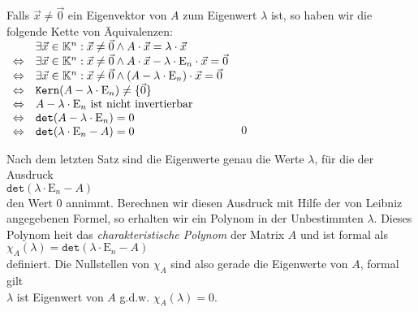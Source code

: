 \proof
Falls $\vec{x} \not= \vec{0}$ ein Eigenvektor von $A$ zum Eigenwert $\lambda$ ist, so haben wir die folgende
Kette von \"Aquivalenzen:
\\[0.2cm]
\hspace*{1.3cm}
$
\begin{array}[b]{lll}
                  & \exists \vec{x} \in \mathbb{K}^n: \vec{x} \not=\vec{0} \wedge A \cdot \vec{x}  = \lambda \cdot \vec{x} \\
\Leftrightarrow   & \exists \vec{x} \in \mathbb{K}^n: \vec{x} \not=\vec{0} \wedge A \cdot \vec{x} - \lambda \cdot \mathrm{E}_n \cdot \vec{x} = \vec{0} \\
\Leftrightarrow   & \exists \vec{x} \in \mathbb{K}^n: \vec{x} \not=\vec{0} \wedge (A - \lambda \cdot \mathrm{E}_n) \cdot \vec{x} = \vec{0} \\
\Leftrightarrow   & \mathtt{Kern}(A - \lambda \cdot \mathrm{E}_n) \not= \{\vec{0}\} \\
\Leftrightarrow   & \mbox{$A - \lambda \cdot \mathrm{E}_n$ ist nicht invertierbar} \\
\Leftrightarrow   & \mathtt{det}(A - \lambda \cdot \mathrm{E}_n) = 0  \\
\Leftrightarrow   & \mathtt{det}(\lambda \cdot \mathrm{E}_n - A) = 0  
\end{array}
$
\qed

Nach dem letzten Satz sind die Eigenwerte genau die Werte $\lambda$, f\"ur die der Ausdruck 
\\[0.2cm]
\hspace*{1.3cm}
 $\mathtt{det}(\lambda \cdot \mathrm{E}_n- A)$
\\[0.2cm]
den Wert $0$ annimmt.  Berechnen wir diesen Ausdruck mit Hilfe der von Leibniz angegebenen Formel,
so erhalten wir ein Polynom in der Unbestimmten $\lambda$.  Dieses Polynom hei\3t das
\emph{charakteristische Polynom} der Matrix $A$ und ist formal als
\\[0.2cm]
\hspace*{1.3cm}
$\chi_A(\lambda) = \mathtt{det}(\lambda \cdot \mathrm{E}_n - A)$
\\[0.2cm]
definiert.  Die Nullstellen von $\chi_A$ sind also gerade die Eigenwerte von $A$, formal gilt
\\[0.2cm]
\hspace*{1.3cm}
$\lambda$ ist Eigenwert von $A$ \quad g.d.w. \quad $\chi_A(\lambda) = 0$.



